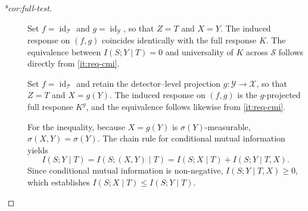 \documentclass[12pt]{article}
\newcommand{\Gens}{\mathcal{S}}
\newcommand{\1}{\mathbbm{1}}
\renewcommand{\[}{\begin{equation}}
\renewcommand{\]}{\end{equation}}
\begin{document}
\begin{proof}[*cor:full-test]
        \begin{description}
            \item[] Set \(f = \operatorname{id}_{\mathcal T}\) and \(g = \operatorname{id}_{\mathcal Y}\), so that \(Z = T\) and \(X = Y\). The induced response on \((f,g)\) coincides identically with the full response \(K\). The equivalence between \(I(S; Y \mid T) = 0\) and universality of \(K\) across \(\Gens\) follows directly from \cref{it:req-cmi}.
            \item[] Set \(f = \operatorname{id}_{\mathcal T}\) and retain the detector--level projection \(g \colon \mathcal Y \to \mathcal X\), so that \(Z = T\) and \(X = g(Y)\). The induced response on \((f,g)\) is the \(g\)-projected full response \(K^g\), and the equivalence follows likewise from \cref{it:req-cmi}.
                
                For the inequality, because \(X = g(Y)\) is \(\sigma(Y)\)-measurable, \(\sigma(X, Y) = \sigma(Y)\). The chain rule for conditional mutual information~\cite{CoverThomas:2006} yields
                \[
                    I(S; Y \mid T) = I(S; (X, Y) \mid T) = I(S; X \mid T) + I(S; Y \mid T, X).
                \]
                Since conditional mutual information is non-negative, \(I(S; Y \mid T, X) \ge 0\), which establishes \(I(S; X \mid T) \le I(S; Y \mid T)\).
        \end{description}
    \end{proof}
\end{document}
